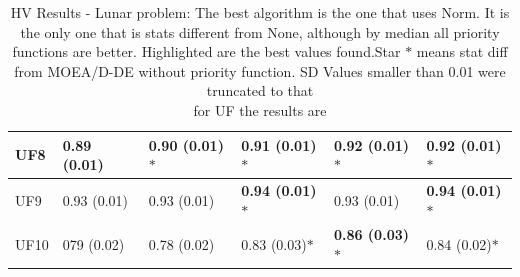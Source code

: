 \begin{table}[!t]
\begin{tabular}{llllll}
		\multicolumn{1}{|l|}{UF8}              & \multicolumn{1}{l}{0.89 (0.01)} & \multicolumn{1}{l}{0.90 (0.01)$*$} & \multicolumn{1}{l}{ 0.91 (0.01)$*$} & \textbf{0.92 (0.01)$*$}             & \textbf{0.92 (0.01)$*$} \\ \hline
		\multicolumn{1}{|l|}{UF9}              & \multicolumn{1}{l}{0.93 (0.01)} & \multicolumn{1}{l}{0.93 (0.01)} & \multicolumn{1}{l}{ \textbf{0.94 (0.01)$*$}} & 0.93 (0.01)             & \textbf{0.94 (0.01)$*$} \\ \hline
		\multicolumn{1}{|l|}{UF10}              & \multicolumn{1}{l}{079 (0.02)} & \multicolumn{1}{l}{0.78 (0.02)} & \multicolumn{1}{l}{ 0.83 (0.03)$*$} & \textbf{0.86 (0.03)$*$}             & 0.84 (0.02)$*$ \\ \hline
	\end{tabular}
	\caption{HV Results - Lunar problem: The best algorithm is the one that uses Norm. It is the only one that is stats different from None, although by median all priority functions are better. Highlighted are the best values found.Star $*$ means stat diff from MOEA/D-DE without priority function. SD Values smaller than 0.01 were truncated to that\\ for UF the results are}
	\label{table_hv}
\end{table}

